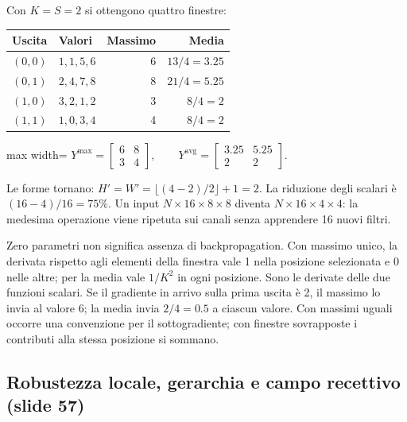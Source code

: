 \documentclass[11pt,a4paper,oneside,openany]{book}
\begin{document}
Con \(K=S=2\) si ottengono quattro finestre:

\begin{longtable}[]{@{}llrr@{}}
\toprule\noalign{}
Uscita & Valori & Massimo & Media \\
\midrule\noalign{}
\endhead
\bottomrule\noalign{}
\endlastfoot
\((0,0)\) & \(1,1,5,6\) & 6 & \(13/4=3.25\) \\
\((0,1)\) & \(2,4,7,8\) & 8 & \(21/4=5.25\) \\
\((1,0)\) & \(3,2,1,2\) & 3 & \(8/4=2\) \\
\((1,1)\) & \(1,0,3,4\) & 4 & \(8/4=2\) \\
\end{longtable}

\begin{center}
\begin{adjustbox}{max width=\linewidth}
$\displaystyle 
\boxed{Y^{\max}=\begin{bmatrix}6&8\\3&4\end{bmatrix}},\qquad
\boxed{Y^{\mathrm{avg}}=\begin{bmatrix}3.25&5.25\\2&2\end{bmatrix}}.
$
\end{adjustbox}
\end{center}

Le forme tornano: \(H'=W'=\lfloor(4-2)/2\rfloor+1=2\). La riduzione degli scalari è \((16-4)/16=75\%\). Un input \(N\times16\times8\times8\) diventa \(N\times16\times4\times4\): la medesima operazione viene ripetuta sui canali senza apprendere 16 nuovi filtri.

Zero parametri non significa assenza di backpropagation. Con massimo unico, la derivata rispetto agli elementi della finestra vale 1 nella posizione selezionata e 0 nelle altre; per la media vale \(1/K^2\) in ogni posizione. Sono le derivate delle due funzioni scalari. Se il gradiente in arrivo sulla prima uscita è 2, il massimo lo invia al valore 6; la media invia \(2/4=0.5\) a ciascun valore. Con massimi uguali occorre una convenzione per il sottogradiente; con finestre sovrapposte i contributi alla stessa posizione si sommano.

\subsection{Robustezza locale, gerarchia e campo recettivo (slide 57)}\label{f02-r865}
\end{document}
